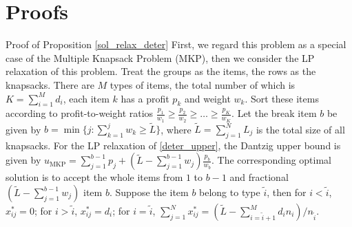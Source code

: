 \clearpage
\section{Proofs}

\begin{pf}{Proof of Proposition \ref{sol_relax_deter}}
  First, we regard this problem as a special case of the Multiple Knapsack Problem (MKP), then we consider the LP relaxation of this problem.
  Treat the groups as the items, the rows as the knapsacks. There are $M$ types of items, the total number of which is $K = \sum_{i=1}^{M} d_i$, each item $k$ has a profit $p_k$ and weight $w_k$. 
  Sort these items according to profit-to-weight ratios $\frac{p_1}{w_1} \geq \frac{p_2}{w_2} \geq \ldots \geq \frac{p_K}{w_K}$. Let the break item $b$ be given by $b=\min \{j: \sum_{k=1}^j w_k \geq \tilde{L}\}$, where $\tilde{L} = \sum_{j=1}^{N} L_j$ is the total size of all knapsacks. 
  For the LP relaxation of \eqref{deter_upper}, the Dantzig upper bound \citep{dantzig1957discrete} is given by $u_{\mathrm{MKP}}=\sum_{j=1}^{b-1} p_j+\left(\tilde{L}-\sum_{j=1}^{b-1} w_j\right) \frac{p_b}{w_b}$. The corresponding optimal solution is to accept the whole items from $1$ to $b-1$ and fractional $(\tilde{L}-\sum_{j=1}^{b-1} w_j)$ item $b$. Suppose the item $b$ belong to type $\tilde{i}$, then for $i < \tilde{i}$, $x_{ij}^{*} = 0$; for $i > \tilde{i}$, $x_{ij}^{*} = d_{i}$; for $i = \tilde{i}$, $\sum_{j=1}^{N} x_{ij}^{*} = (\tilde{L} - \sum_{i = \tilde{i}+1}^{M} {d_i n_i})/ n_{\tilde{i}}$.
\end{pf}


